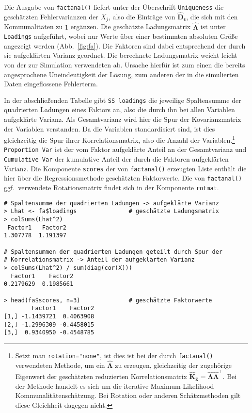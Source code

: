 Die Ausgabe von \lstinline!factanal()! liefert unter der Überschrift \lstinline!Uniqueness! die geschätzten Fehlervarianzen der $X_{j}$, also die Einträge von $\hat{\bm{D}}_{\bm{\epsilon}}$, die sich mit den Kommunalitäten zu $1$ ergänzen. Die geschätzte Ladungsmatrix $\hat{\bm{\Lambda}}$ ist unter \lstinline!Loadings! aufgeführt, wobei nur Werte über einer bestimmten absoluten Größe angezeigt werden (Abb.\ \ref{fig:fa}). Die Faktoren sind dabei entsprechend der durch sie aufgeklärten Varianz geordnet. Die berechnete Ladungsmatrix weicht leicht von der zur Simulation verwendeten ab. Ursache hierfür ist zum einen die bereits angesprochene Uneindeutigkeit der Lösung, zum anderen der in die simulierten Daten eingeflossene Fehlerterm.

In der abschließenden Tabelle gibt \lstinline!SS loadings! die jeweilige Spaltensumme der quadrierten Ladungen eines Faktors an, also die durch ihn bei allen Variablen aufgeklärte Varianz. Als Gesamtvarianz wird hier die Spur der Kovarianzmatrix der Variablen verstanden. Da die Variablen standardisiert sind, ist dies gleichzeitig die Spur ihrer Korrelationsmatrix, also die Anzahl der Variablen.\footnote{Setzt man \lstinline!rotation="none"!, ist dies ist bei der durch \lstinline!factanal()! verwendeten Methode, um ein $\hat{\bm{\Lambda}}$ zu erzeugen, gleichzeitig der zugehörige Eigenwert der geschätzten reduzierten Korrelationsmatrix $\hat{\bm{K}}_{\hat{\bm{x}}} = \hat{\bm{\Lambda}} \hat{\bm{\Lambda}}^{\top}$. Bei der Methode handelt es sich um die iterative Maximum-Likelihood Kommunalitätenschätzung. Bei Rotation oder anderen Schätzmethoden gilt diese Gleichheit dagegen nicht.} \lstinline!Proportion Var! ist der vom Faktor aufgeklärte Anteil an der Gesamtvarianz und \lstinline!Cumulative Var! der kumulative Anteil der durch die Faktoren aufgeklärten Varianz. Die Komponente \lstinline!scores! der von \lstinline!factanal()! erzeugten Liste enthält die hier über die Regressionsmethode geschätzten Faktorwerte. Die von \lstinline!factanal()! ggf.\ verwendete Rotationsmatrix findet sich in der Komponente \lstinline!rotmat!.
\begin{lstlisting}
# Spaltensumme der quadrierten Ladungen -> aufgeklärte Varianz
> Lhat <- fa$loadings               # geschätzte Ladungsmatrix
> colSums(Lhat^2)
 Factor1   Factor2
1.307778  1.191397

# Spaltensummen der quadrierten Ladungen geteilt durch Spur der
# Korrelationsmatrix -> Anteil der aufgeklärten Varianz
> colSums(Lhat^2) / sum(diag(cor(X)))
  Factor1    Factor2
0.2179629  0.1985661

> head(fa$scores, n=3)              # geschätzte Faktorwerte
        Factor1    Factor2
[1,] -1.1439721  0.4063908
[2,] -1.2996309 -0.4458015
[3,]  0.9340950 -0.4548785
\end{lstlisting}

